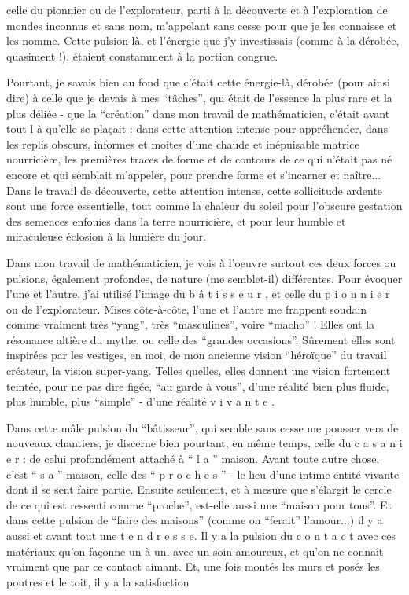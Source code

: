 celle du pionnier ou de l'explorateur, parti à la découverte et à l'exploration de mondes inconnus et sans nom, m'appelant sans cesse pour que je les connaisse et les nomme. Cette pulsion-là, et l'énergie que j'y investissais (comme à la dérobée, quasiment !), étaient constamment à la portion congrue.

Pourtant, je savais bien au fond que c'était cette énergie-là, dérobée (pour ainsi dire) à celle que je devais à mes ``tâches'', qui était de l'essence la plus rare et la plus déliée - que la ``création'' dans mon travail de mathématicien, c'était avant tout l à qu'elle se plaçait : dans cette attention intense pour appréhender, dans les replis obscurs, informes et moites d'une chaude et inépuisable matrice nourricière, les premières traces de forme et de contours de ce qui n'était pas né encore et qui semblait m'appeler, pour prendre forme et s'incarner et naître... Dans le travail de découverte, cette attention intense, cette sollicitude ardente sont une force essentielle, tout comme la chaleur du soleil pour l'obscure gestation des semences enfouies dans la terre nourricière, et pour leur humble et miraculeuse éclosion à la lumière du jour.

Dans mon travail de mathématicien, je vois à l'oeuvre surtout ces deux forces ou pulsions, également profondes, de nature (me semble\unsure{-{}-|-}t-il) différentes. Pour évoquer l'une et l'autre, j'ai utilisé l'image du b â t i s s e u r , et celle du p i o n n i e r ou de l'explorateur. Mises côte-à-côte, l'une et l'autre me frappent soudain comme vraiment très ``yang'', très ``masculines'', voire ``macho'' ! Elles ont la résonance altière du mythe, ou celle des ``grandes occasions''. Sûrement elles sont inspirées par les vestiges, en moi, de mon ancienne vision ``héroïque'' du travail créateur, la vision super-yang. Telles quelles, elles donnent une vision fortement teintée, pour ne pas dire figée, ``au garde à vous'', d'une réalité bien plus fluide, plus humble, plus ``simple'' - d'une réalité v i v a n t e .

Dans cette mâle pulsion du ``bâtisseur'', qui semble sans cesse me pousser vers de nouveaux chantiers, je discerne bien pourtant, en même temps, celle du c a s a n i e r : de celui profondément attaché à `` l a '' maison. Avant toute autre chose, c'est `` s a '' maison, celle des `` p r o c h e s '' - le lieu d'une intime entité vivante dont il se sent faire partie. Ensuite seulement, et à mesure que s'élargit le cercle de ce qui est ressenti comme ``proche'', est-elle aussi une ``maison pour tous''. Et dans cette pulsion de ``faire des maisons'' (comme on ``ferait'' l'amour...) il y a aussi et avant tout une t e n d r e s s e. Il y a la pulsion du c o n t a c t avec ces matériaux qu'on façonne un à un, avec un soin amoureux, et qu'on ne connaît vraiment que par ce contact aimant. Et, une fois montés les murs et posés les poutres et le toit, il y a la satisfaction

